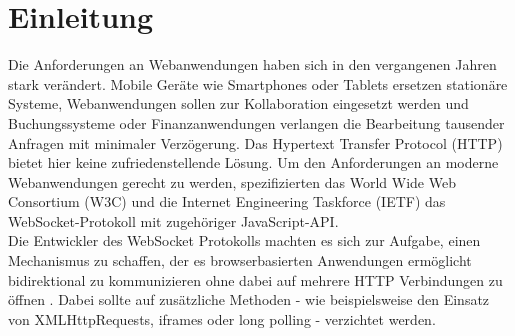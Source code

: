 \documentclass[11pt,a4paper,titlepage]{scrartcl}
\numberwithin{equation}{section}
\begin{document}
  \pagestyle{headings}

\section{Einleitung}\label{sec:Einleitung}
Die Anforderungen an Webanwendungen haben sich in den vergangenen Jahren stark verändert. Mobile Geräte wie Smartphones oder Tablets ersetzen stationäre Systeme, Webanwendungen sollen zur Kollaboration eingesetzt werden und Buchungssysteme oder Finanzanwendungen verlangen die Bearbeitung tausender Anfragen mit minimaler Verzögerung. Das Hypertext Transfer Protocol (HTTP) bietet hier keine zufriedenstellende Lösung. Um den Anforderungen an moderne Webanwendungen gerecht zu werden, spezifizierten das World Wide Web Consortium (W3C) und die Internet Engineering Taskforce (IETF) das WebSocket-Protokoll mit zugehöriger JavaScript-API. \\

\noindent Die Entwickler des WebSocket Protokolls machten es sich zur Aufgabe, einen Mechanismus zu schaffen, der es browserbasierten Anwendungen ermöglicht bidirektional zu kommunizieren ohne dabei auf mehrere HTTP Verbindungen zu öffnen \autocite{fette_websocket_2011}. Dabei sollte auf zusätzliche Methoden - wie beispielsweise den Einsatz von XMLHttpRequests, iframes oder long polling - verzichtet werden.

\newpage
\end{document}

